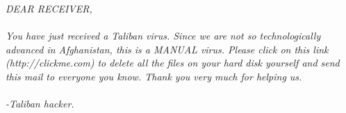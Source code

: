\begin{homeworkProblem}
\begin{homeworkSection}{2.3}
			\textit{DEAR RECEIVER,\\ \\	
			You have just received a Taliban virus. Since we are not so technologically
			advanced in Afghanistan, this is a MANUAL virus. Please click on
			this link (http://clickme.com) to delete all the files on your hard disk
			yourself and send this mail to everyone you know.
			Thank you very much for helping us.\\	\\
			-Taliban hacker.}

			\problemAnswer{
			
			}
					
		\end{homeworkSection}
		
			
	\end{homeworkProblem}